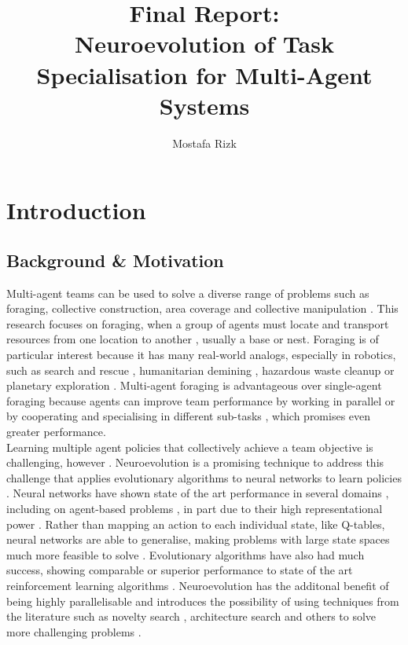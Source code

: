 \documentclass[12pt]{article}
\title{Final Report:\\ Neuroevolution of Task Specialisation for Multi-Agent Systems}
\author{Mostafa Rizk}
\begin{document}
\maketitle

\section{Introduction}

\subsection{Background \& Motivation}

Multi-agent teams can be used to solve a diverse range of problems such as foraging, collective construction, area coverage and collective manipulation \cite{hamann:Springer:2018,bayindir:neuro:2016,brambilla:SI:2013}.
This research focuses on foraging, when a group of agents must locate and transport resources from one location to another \cite{hamann:Springer:2018,bayindir:neuro:2016,brambilla:SI:2013}, usually a base or nest.
Foraging is of particular interest because it has many real-world analogs, especially in robotics, such as search and rescue \cite{hamann:Springer:2018,bayindir:neuro:2016,brambilla:SI:2013, khamis:Springer:2015}, humanitarian demining \cite{bayindir:neuro:2016,brambilla:SI:2013, khamis:Springer:2015}, hazardous waste cleanup \cite{bayindir:neuro:2016} or planetary exploration \cite{bayindir:neuro:2016}. 
Multi-agent foraging is advantageous over single-agent foraging because agents can improve team performance by working in parallel \cite{khamis:Springer:2015, ericksen:SSCI:2017} or by cooperating and specialising in different sub-tasks \cite{ferrante:PLOS_CB:2015, pini:Swarm_Intelligence:2011, pini:ICSI:2012}, which promises even greater performance.\\

Learning multiple agent policies that collectively achieve a team objective is challenging, however \cite{trianni:SCI:2008,francesca:SI:2014}.
Neuroevolution is a promising technique to address this challenge that applies evolutionary algorithms to neural networks to learn policies \cite{stanley:Nature:2019} .
Neural networks have shown state of the art performance in several domains \cite{marcus:arXiv:2018:deep}, including on agent-based problems \cite{marcus:arXiv:2018:innateness}, in part due to their high representational power \cite{such:arXiv:2017}.
Rather than mapping an action to each individual state, like Q-tables, neural networks are able to generalise, making problems with large state spaces much more feasible to solve \cite{such:arXiv:2017}.
Evolutionary algorithms have also had much success, showing comparable or superior performance to state of the art reinforcement learning algorithms \cite{such:arXiv:2017, salimans:arXiv:2017}.
Neuroevolution has the additonal benefit of being highly parallelisable \cite{salimans:arXiv:2017} and introduces the possibility of using techniques from the literature such as novelty search \cite{lehman:Springer:2011, gomes:SI:2013, gomes:EC:2017}, architecture search \cite{elsken:arXiv:2018, wistuba:arXiv:2019} and others to solve more challenging problems \cite{stanley:Nature:2019}.\\
\end{document}
